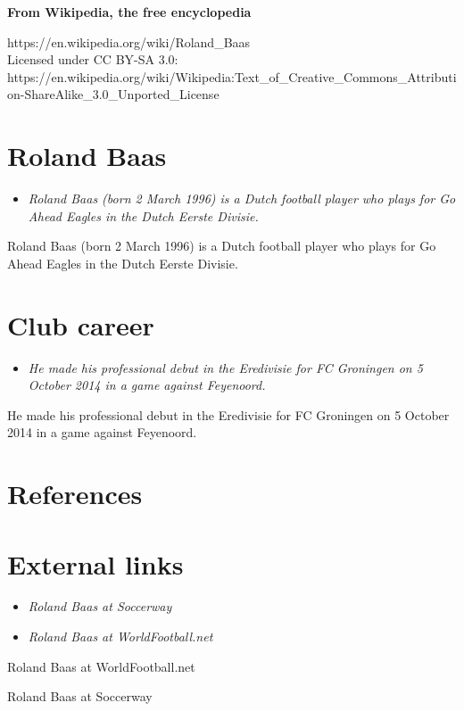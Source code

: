 \textbf{From Wikipedia, the free encyclopedia}

https://en.wikipedia.org/wiki/Roland\_Baas\\
Licensed under CC BY-SA 3.0:\\
https://en.wikipedia.org/wiki/Wikipedia:Text\_of\_Creative\_Commons\_Attribution-ShareAlike\_3.0\_Unported\_License

\section{Roland Baas}\label{roland-baas}

\begin{itemize}
\item
  \emph{Roland Baas (born 2 March 1996) is a Dutch football player who
  plays for Go Ahead Eagles in the Dutch Eerste Divisie.}
\end{itemize}

Roland Baas (born 2 March 1996) is a Dutch football player who plays for
Go Ahead Eagles in the Dutch Eerste Divisie.

\section{Club career}\label{club-career}

\begin{itemize}
\item
  \emph{He made his professional debut in the Eredivisie for FC
  Groningen on 5 October 2014 in a game against Feyenoord.}
\end{itemize}

He made his professional debut in the Eredivisie for FC Groningen on 5
October 2014 in a game against Feyenoord.

\section{References}\label{references}

\section{External links}\label{external-links}

\begin{itemize}
\item
  \emph{Roland Baas at Soccerway}
\item
  \emph{Roland Baas at WorldFootball.net}
\end{itemize}

Roland Baas at WorldFootball.net

Roland Baas at Soccerway
